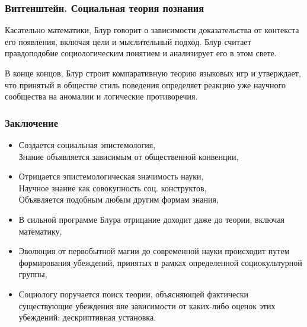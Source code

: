 \documentclass[10pt]{beamer}
\begin{document}
\begin{frame}[label=book2-2]%
  \frametitle{Витгенштейн. Социальная теория познания}

  Касательно математики, Блур говорит о зависимости доказательства от 
  контекста его появления, включая цели и мыслительный подход. Блур 
  считает правдоподобие социологическим понятием и анализирует его 
  в этом свете.

  \vfill
  В конце концов, Блур строит компаративную теорию языковых игр 
  и утверждает, что принятый в обществе стиль поведения определяет 
  реакцию уже научного сообщества на аномалии и логические противоречия.
\end{frame}%

\begin{frame}[label=summary]%
  \frametitle{Заключение}

  \begin{itemize}
    \item Создается социальная эпистемология,
      \\ Знание объявляется зависимым от общественной конвенции,
    \item Отрицается эпистемологическая значимость науки,
      \\ Научное знание как совокупность соц. конструктов,
      \\ Объявляется подобным любым другим формам знания,
    \item В сильной программе Блура отрицание доходит даже до теории, 
      включая математику,
    \item Эволюция от первобытной магии до современной науки происходит 
      путем формирования убеждений, принятых в рамках определенной 
      социокультурной группы,
    \item Социологу поручается поиск теории, объясняющей фактически 
      существующие убеждения вне зависимости от каких-либо оценок этих 
      убеждений: дескриптивная установка.
  \end{itemize}
\end{frame}%
\end{document}
